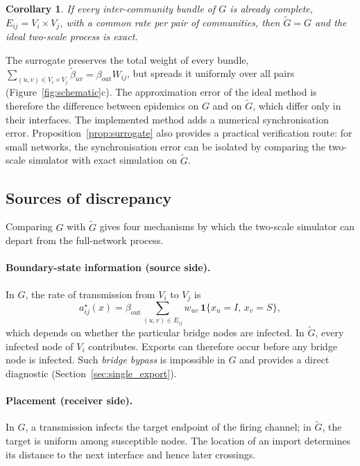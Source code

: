 \documentclass[a4paper,fleqn]{cas-sc}
\newtheorem{corollary}{Corollary}
\newcommand{\ind}{\mathbf{1}}
\begin{document}
\begin{corollary}
\label{cor:exact}
If every inter-community bundle of $G$ is already complete, $E_{ij}=V_i\times V_j$, with a common rate per pair of communities, then $\tilde G=G$ and the ideal two-scale process is exact.
\end{corollary}

The surrogate preserves the total weight of every bundle, $\sum_{(u,v)\in V_i\times V_j}\tilde\beta_{uv}=\beta_{\mathrm{out}}W_{ij}$, but spreads it uniformly over all pairs (Figure~\ref{fig:schematic}c). The approximation error of the ideal method is therefore the difference between epidemics on $G$ and on $\tilde G$, which differ only in their interfaces. The implemented method adds a numerical synchronisation error. Proposition~\ref{prop:surrogate} also provides a practical verification route: for small networks, the synchronisation error can be isolated by comparing the two-scale simulator with exact simulation on $\tilde G$.

\subsection{Sources of discrepancy}
\label{sec:sources}

Comparing $G$ with $\tilde G$ gives four mechanisms by which the two-scale simulator can depart from the full-network process.

\paragraph{Boundary-state information (source side).}
In $G$, the rate of transmission from $V_i$ to $V_j$ is
\begin{equation}
\label{eq:exact_rate}
a^\star_{ij}(x)=\beta_{\mathrm{out}}\sum_{(u,v)\in E_{ij}}w_{uv}\,\ind\{x_u=I,\,x_v=S\},
\end{equation}
which depends on whether the particular bridge nodes are infected. In $\tilde G$, every infected node of $V_i$ contributes. Exports can therefore occur before any bridge node is infected. Such \emph{bridge bypass} is impossible in $G$ and provides a direct diagnostic (Section~\ref{sec:single_export}).

\paragraph{Placement (receiver side).}
In $G$, a transmission infects the target endpoint of the firing channel; in $\tilde G$, the target is uniform among susceptible nodes. The location of an import determines its distance to the next interface and hence later crossings.
\end{document}

